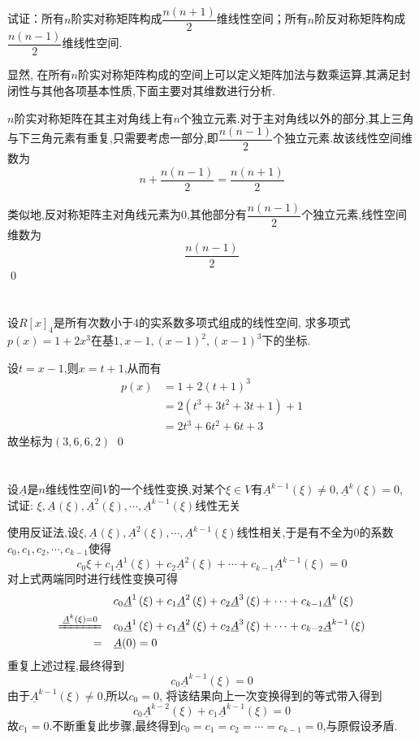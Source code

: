 \documentclass{matrix-homework}
\begin{document}

\section{}
试证：所有$n$阶实对称矩阵构成$\dfrac{n(n+1)}{2}$维线性空间；所有$n$阶反对称矩阵构成$\dfrac{n(n-1)}{2}$维线性空间.

\answer
显然, 在所有$n$阶实对称矩阵构成的空间上可以定义矩阵加法与数乘运算,其满足封闭性与其他各项基本性质,下面主要对其维数进行分析.

$n$阶实对称矩阵在其主对角线上有$n$个独立元素.对于主对角线以外的部分,其上三角与下三角元素有重复,只需要考虑一部分,即$\dfrac{n(n-1)}{2}$个独立元素.故该线性空间维数为
$$ n + \dfrac{n(n-1)}{2} = \dfrac{n(n+1)}{2} $$

类似地,反对称矩阵主对角线元素为0,其他部分有$\dfrac{n(n-1)}{2}$个独立元素,线性空间维数为
$$\dfrac{n(n-1)}{2}$$
\qed

\section{}
设$R[x]_4$是所有次数小于4的实系数多项式组成的线性空间, 求多项式$p(x)=1+2x^3$在基$1,x-1,(x-1)^2,(x-1)^3$下的坐标.

\answer
设$t=x-1$,则$x=t+1$,从而有
\begin{align*}
    p(x) & = 1+2(t+1)^3                 \\
         & = 2(t^3 + 3t^2 + 3t + 1) + 1 \\
         & = 2t^3 +6t^2 +6t +3
\end{align*}
故坐标为$(3,6,6,2)$
\qed

\newpage
\section{}
\newcommand{\Axi}[1]{\underline{A}^{#1}\left(\xi\right)}
设$\underline{A}$是$n$维线性空间$V$的一个线性变换,对某个$\xi \in V$有$\Axi{k-1} \neq0, \Axi{k} =0$, 试证: $\xi,\Axi{},\Axi{2},\cdots,\Axi{k-1}$线性无关

\answer
使用反证法,设$\xi,\Axi{},\Axi{2},\cdots,\Axi{k-1}$线性相关,于是有不全为0的系数$c_0,c_1,\allowbreak c_2,\allowbreak\cdots,c_{k-1}$使得
$$ c_0\xi + c_1\Axi{1} + c_2\Axi{2} + \cdots + c_{k-1}\Axi{k-1} = 0 $$
对上式两端同时进行线性变换可得
\begin{align*}
                                   & c_0 \Axi{1} + c_1 \Axi{2} + c_2 \Axi{3} + \cdots + c_{k-1} \Axi{k}      \\
    \xlongequal[]{\Axi{k}=0} \quad & c_0 \Axi{1} + c_1 \Axi{2} + c_2 \Axi{3} + \cdots + c_{k-2} \Axi{k-1}    \\
    =                        \quad & \underline{A}(0)    =                                                 0
\end{align*}
重复上述过程,最终得到
$$c_0\Axi{k-1}=0$$
由于$\Axi{k-1}\ne0$,所以$c_0=0$, 将该结果向上一次变换得到的等式带入得到
$$c_0\Axi{k-2} + c_1\Axi{k-1}=0$$
故$c_1=0$.不断重复此步骤,最终得到$c_0=c_1=c_2=\cdots=c_{k-1}=0$,与原假设矛盾.
\end{document}
